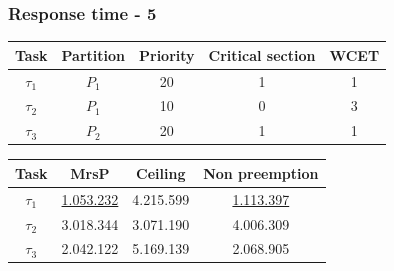 \documentclass{beamer}
\begin{document}
\begin{frame}
  \frametitle{Response time - 5}

  \begin{table}
  \centering
  \begin{tabular}{ccccc}
  \hline\hline
    Task & Partition     & Priority & Critical section & WCET  \\ \hline
    $\tau_1$ & $P_1$  & 20 & 1 & 1 \\
    $\tau_2$ & $P_1$  & 10 & 0 & 3 \\
    $\tau_3$ & $P_2$  & 20 & 1 & 1 \\
    \hline
    \end{tabular}
  \end{table}

  \begin{table}
  \centering
  \begin{tabular}{cccc}
  \hline\hline
    Task & MrsP & Ceiling & Non preemption \\ \hline
    $\tau_1$ & \underline{1.053.232} & 4.215.599 & \underline{1.113.397} \\
    $\tau_2$ & 3.018.344 & 3.071.190 & 4.006.309 \\
    $\tau_3$ & 2.042.122 & 5.169.139 & 2.068.905 \\
    \hline
    \end{tabular}
  \end{table}

\end{frame}
\end{document}
